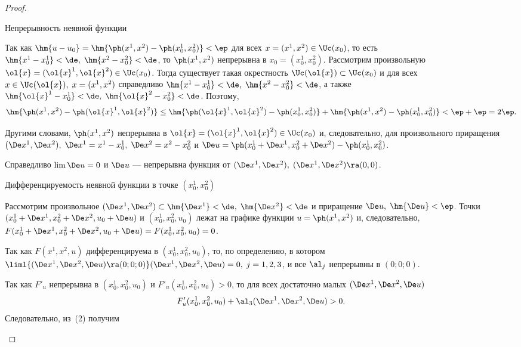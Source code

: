\documentclass[a4paper]{article}
\begin{document}
\begin{proof}
\begin{points}{-1}
\item Непрерывность неявной функции

Так как $\hm{u-u_0} = \hm{\ph(x^1,x^2) - \ph(x_0^1,x_0^2)} < \ep$
для всех $x=(x^1,x^2) \in \Uc(x_0)$, то есть $\hm{x^1 - x_0^1} <
\de, \; \hm{x^2 - x_0^2}<\de$, то $\ph(x^1,x^2)$ непрерывна в $x_0 =
(x_0^1,x_0^2)$. Рассмотрим произвольную $\ol{x} = (\ol{x}^1,
\ol{x}^2) \in \Uc(x_0)$. Тогда существует такая окрестность
$\Uc(\ol{x}) \subset \Uc(x_0)$ и для всех $x\in \Uc(\ol{x}), \;
x=(x^1,x^2)$ справедливо $\hm{x^1 - x^1_0}<\de, \; \hm{x^2 - x^2_0}
< \de$, а также $\hm{\ol{x}^1 - x_0^1} < \de, \; \hm{\ol{x}^2 -
x_0^2} < \de$. Поэтому, $$\hm{\ph(x^1,x^2) - \ph(\ol{x}^1,\ol{x}^2)}
\le \hm{ \ph(\ol{x}^1,\ol{x}^2) - \ph(x_0^1,x_0^2)} +
\hm{\ph(x^1,x^2) - \ph(x_0^1,x_0^2)} < \ep+\ep = 2\ep.$$

Другими словами, $\ph(x^1,x^2)$ непрерывна в $\ol{x} =
(\ol{x}^1,\ol{x}^2) \in \Uc(x_0)$ и, следовательно, для
произвольного приращения $(\De x^1,\De x^2), \; \De x^1 = x^1 -
x_0^1, \; \De x^2 = x^2 - x_0^2$ и $\De u = \ph(x_0^1 + \De x^1,
x_0^2 + \De x^2) - \ph(x_0^1,x_0^2)$.

Справедливо $\lim\De u=0$ и $\De u$ --- непрерывна функция от $(\De
x^1,\De x^2), \; (\De x^1, \De x^2) \ra (0,0)$.

\item Дифференцируемость неявной функции в точке $(x_0^1,x_0^2)$

Рассмотрим произвольное $(\De x^1, \De x^2) \subset \hm{\De
x^1}<\de, \; \hm{\De x^2} < \de$ и приращение $\De u, \; \hm{\De u}
< \ep$. Точки $(x_0^1 + \De x^1, x_0^2 + \De x^2, u_0 + \De u)$ и
$(x_0^1,x_0^2,u_0)$ лежат на графике функции $u=\ph(x^1,x^2)$ и,
следовательно, $F(x_0^1 + \De x^1, x_0^2 + \De x^2, u_0 + \De u) =
F(x_0^1,x_0^2, u_0) = 0$.

Так как $F(x^1,x^2,u)$ дифференцируема в $(x_0^1,x_0^2,u_0)$, то, по
определению,
в котором $\liml{(\De x^1,\De x^2, \De u)\ra(0;0;0)} (\De x^1,\De
x^2, \De u) = 0, \; j=1,2,3$, и все $\al_j$ непрерывны в $(0;0;0)$.

Так как $F'_u$ непрерывна в $(x_0^1,x_0^2,u_0)$ и $F'_u(x_0^1,x_0^2,
u_0) > 0$, то для всех достаточно малых $(\De x^1, \De x^2, \De u)$
$$F'_u(x_0^1,x_0^2,u_0) + \al_3(\De x^1, \De x^2, \De u) > 0.$$
Следовательно, из~(2) получим 


\end{points}
\end{proof}
\end{document}
